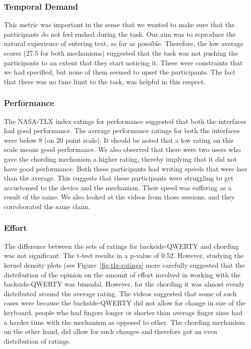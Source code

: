 \subsubsection{Temporal Demand}

This metric was important in the sense that we wanted to make sure
that the participants do not feel rushed during the task. Our aim was
to reproduce the natural experience of entering text, as far as
possible. Therefore, the low average scores (27.5 for both mechanisms)
suggested that the task was not pushing the participants to an extent
that they start noticing it. There were constraints that we had
specified, but none of them seemed to upset the participants. The fact
that there was no time limit to the task, was helpful in this respect.

\subsubsection{Performance}

The NASA-TLX index ratings for performance suggested that both the
interfaces had good performance. The average performance ratings for
both the interfaces were below 8 (on 20 point scale). It should be
noted that a low rating on this scale means good performance. We also
observed that there were two users who gave the chording mechanism a
higher rating, thereby implying that it did not have good
performance. Both these participants had writing speeds that were lass
than the average. This suggests that these participants were
struggling to get accustomed to the device and the mechanism. Their
speed was suffering as a result of the same. We also looked at the
videos from those sessions, and they corroborated the same claim.

\subsubsection{Effort}

The difference between the sets of ratings for backside-QWERTY and
chording was not significant. The t-test results in a p-value of
0.52. However, studying the kernel density plots (see
Figure~\ref{fig:tlx-ratings} more carefully suggested that the
distribution of the opinion on the amount of effort involved in
working with the backside-QWERTY was bimodal. However, for the
chording it was almost evenly distributed around the average
rating. The videos suggested that some of such cases were because the
backside-QWERTY did not allow for change in size of the keyboard,
people who had fingers longer or shorter than average finger sizes had
a harder time with the mechanism as opposed to other. The chording
mechanism on the other hand, did allow for such changes and therefore
got an even distribution of ratings.

